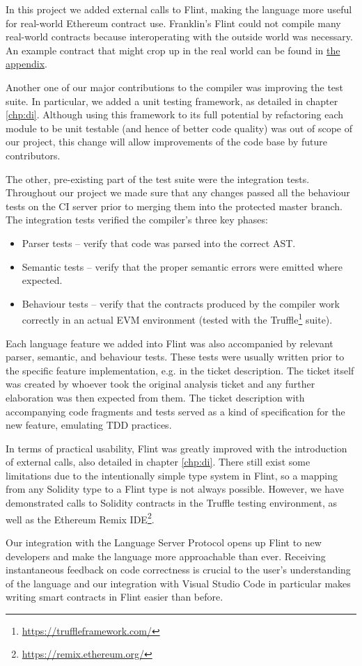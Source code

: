 In this project we added external calls to Flint, making the language more useful for real-world Ethereum contract use. Franklin's Flint could not compile many real-world contracts because interoperating with the outside world was necessary. An example contract that might crop up in the real world can be found in \hyperref[chp:appendix-c]{the appendix}.

Another one of our major contributions to the compiler was improving the test suite. In particular, we added a unit testing framework, as detailed in chapter \ref{chp:di}. Although using this framework to its full potential by refactoring each module to be unit testable (and hence of better code quality) was out of scope of our project, this change will allow improvements of the code base by future contributors.

The other, pre-existing part of the test suite were the integration tests. Throughout our project we made sure that any changes passed all the behaviour tests on the CI server prior to merging them into the protected master branch. The integration tests verified the compiler’s three key phases:

\begin{itemize}
	\item Parser tests – verify that code was parsed into the correct AST.
	\item Semantic tests – verify that the proper semantic errors were emitted where expected.
	\item Behaviour tests – verify that the contracts produced by the compiler work correctly in an actual EVM environment (tested with the Truffle\footnote{\url{https://truffleframework.com/}} suite).
\end{itemize}

Each language feature we added into Flint was also accompanied by relevant parser, semantic, and behaviour tests. These tests were usually written prior to the specific feature implementation, e.g. in the ticket description. The ticket itself was created by whoever took the original analysis ticket and any further elaboration was then expected from them. The ticket description with accompanying code fragments and tests served as a kind of specification for the new feature, emulating TDD practices.

In terms of practical usability, Flint was greatly improved with the introduction of external calls, also detailed in chapter \ref{chp:di}. There still exist some limitations due to the intentionally simple type system in Flint, so a mapping from any Solidity type to a Flint type is not always possible. However, we have demonstrated calls to Solidity contracts in the Truffle testing environment, as well as the Ethereum Remix IDE\footnote{\url{https://remix.ethereum.org/}}.

Our integration with the Language Server Protocol opens up Flint to new developers and make the language more approachable than ever. Receiving instantaneous feedback on code correctness is crucial to the user’s understanding of the language and our integration with Visual Studio Code in particular makes writing smart contracts in Flint easier than before.
